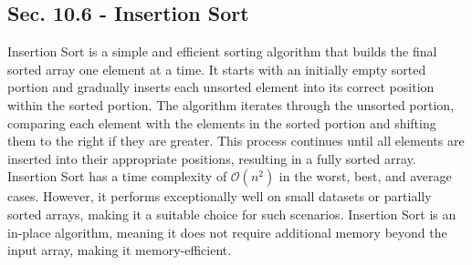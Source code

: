 \subsection*{Sec. 10.6 - Insertion Sort}

Insertion Sort is a simple and efficient sorting algorithm that builds the final sorted array one element at a time. It starts with an initially empty sorted portion and gradually inserts each unsorted element into its correct position within the sorted portion. The algorithm iterates through the unsorted portion, comparing each element with the elements in
the sorted portion and shifting them to the right if they are greater. This process continues until all elements are inserted into their appropriate positions, resulting in a fully sorted array. Insertion Sort has a time complexity of $\mathcal{O}(n^2)$ in the worst, best, and average cases. However, it performs exceptionally well on small datasets or partially
sorted arrays, making it a suitable choice for such scenarios. Insertion Sort is an in-place algorithm, meaning it does not require additional memory beyond the input array, making it memory-efficient.


